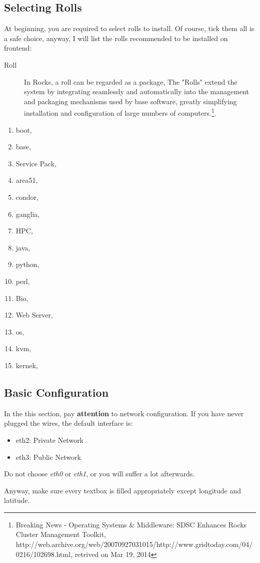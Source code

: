 \subsection{Selecting Rolls}
At beginning, you are required to select rolls to install. Of course, tick them all is a safe choice, anyway, I will list the rolls recommended to be installed on frontend:
\begin{remark}
\begin{description}
\item[Roll] In Rocks, a roll can be regarded as a package, The "Rolls" extend the system by integrating seamlessly and automatically into the management and packaging mechanisms used by base software, greatly simplifying installation and configuration of large numbers of computers.\footnote{Breaking News - Operating Systems \& Middleware: SDSC Enhances Rocks Cluster Management Toolkit, http://web.archive.org/web/20070927031015/http://www.gridtoday.com/04/0216/102698.html, retrived on Mar 19, 2014}.
\end{description}
\end{remark}
\begin{enumerate}
\item boot,
\item base, 
\item Service Pack, 
\item area51, 
\item condor, 
\item ganglia, 
\item HPC,
\item java, 
\item python, 
\item perl, 
\item Bio, 
\item Web Server, 
\item os,
\item kvm,
\item kernek,
\end{enumerate}

\subsection{Basic Configuration}
In the this section, pay {\bf attention} to network configuration. If you have never plugged the wires, the default interface is:
\begin{itemize}
\item eth2: Private Network
\item eth3: Public Network
\end{itemize}
\begin{remark}
Do not choose {\it eth0} or {\it eth1}, or you will suffer a lot afterwards.
\end{remark}
Anyway, make sure every textbox is filled appropriately except longitude and latitude.

